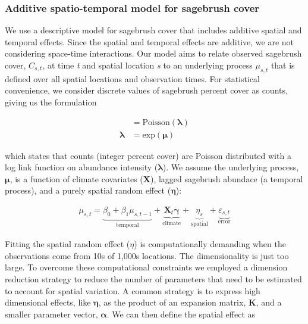 \documentclass[12pt,]{article}
\begin{document}
\subsubsection{Additive spatio-temporal model for sagebrush
cover}\label{additive-spatio-temporal-model-for-sagebrush-cover}

We use a descriptive model for sagebrush cover that includes additive
spatial and temporal effects. Since the spatial and temporal effects are
additive, we are not considering space-time interactions. Our model aims
to relate observed sagebrush cover, \(C_{s,t}\), at time \emph{t} and
spatial location \emph{s} to an underlying process \(\mu_{s,t}\) that is
defined over all spatial locations and observation times. For
statistical convenience, we consider discrete values of sagebrush
percent cover as counts, giving us the formulation

\begin{align}
[\textbf{C}] &= \text{Poisson}(\boldsymbol{\lambda}) \\
\boldsymbol{\lambda} &= \text{exp}(\boldsymbol{\mu}) 
\end{align}

which states that counts (integer percent cover) are Poisson distributed
with a log link function on abundance intensity
(\(\boldsymbol{\lambda}\)). We assume the underlying process,
\(\boldsymbol{\mu}\), is a function of climate covariates (\textbf{X}),
lagged sagebrush abundace (a temporal process), and a purely spatial
random effect (\(\boldsymbol{\eta}\)):

\begin{align}
\mu_{s,t} = \underbrace{\beta_{0} + \beta_{1}\mu_{s,t-1}}_\text{temporal} + \underbrace{\mathbf{X}_{t}\boldsymbol{\gamma}}_\text{climate} + \underbrace{\eta_{s}}_\text{spatial} + \underbrace{\varepsilon_{s,t}}_\text{error}
\end{align}

Fitting the spatial random effect (\(\eta\)) is computationally
demanding when the observations come from 10s of 1,000s locations. The
dimensionality is just too large. To overcome these computational
constraints we employed a dimension reduction strategy to reduce the
number of parameters that need to be estimated to account for spatial
variation. A common strategy is to express high dimensional effects,
like \(\boldsymbol{\eta}\), as the product of an expansion matrix,
\textbf{K}, and a smaller parameter vector, \(\boldsymbol{\alpha}\). We
can then define the spatial effect as
\end{document}
